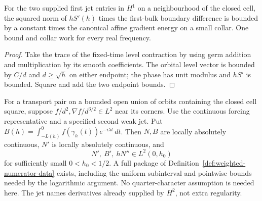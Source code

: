 \begin{lemma}
\label{lem:first-bulk-boundary-square}
\leanok
For the two supplied first jet entries in $H^1$ on a neighbourhood of
the closed cell, the squared norm of $hS'(h)$ times the first-bulk boundary
difference is bounded by a constant times the canonical affine gradient
energy on a small collar. One bound and collar work for every real frequency.
\end{lemma}
\begin{proof}
\leanok
Take the trace of the fixed-time level contraction by using germ addition
and multiplication by its smooth coefficients. The orbital level vector
is bounded by $C/d$ and $d\ge\sqrt h$ on either endpoint; the phase has
unit modulus and $hS'$ is bounded. Square and add the two endpoint bounds.
\end{proof}

\begin{lemma}
\label{lem:weighted-numerator-estimates}
\leanok
For a transport pair on a bounded open union of orbits containing the
closed cell square, suppose $f/d^2,\nabla f/d^{3/2}\in L^2$ near its corners.
Use the continuous forcing representative and a specified second weak jet.
Put $B(h)=\int_{-L(h)}^0f(\gamma_h(t))e^{-i\lambda t}\,dt$.
Then $N,B$ are locally absolutely continuous, $N'$ is locally absolutely
continuous, and
\[
 N',\ B',\ hN''\in L^2(0,h_0)
\]
for sufficiently small $0<h_0<1/2$. A full package of
Definition~\ref{def:weighted-numerator-data} exists, including the uniform
subinterval and pointwise bounds needed by the logarithmic argument.
No quarter-character assumption is needed here. The jet names derivatives
already supplied by $H^2$, not extra regularity.
\end{lemma}

